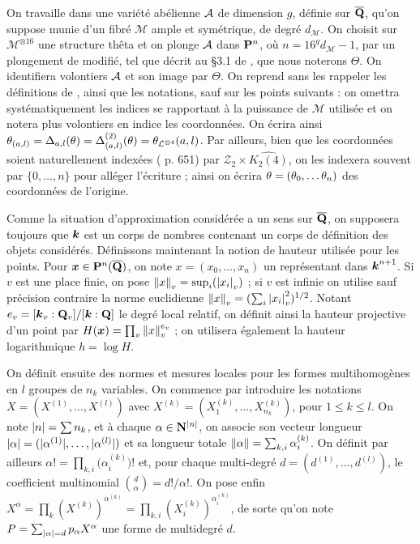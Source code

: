 On travaille dans une variété abélienne $\mathcal A$ de dimension $g$, définie sur
$\overline{\mathbf{Q}}$, qu'on suppose munie d'un fibré $\mathcal{M}$ ample et symétrique, de
degré $d_\mathcal{M}$. On choisit sur $\mathcal{M}^{\otimes 16}$ une structure
thêta et on plonge $\mathcal A$ dans $\mathbf{P}^n$, où $n=16^g d_\mathcal{M} - 1$, par un
plongement de  modifié, tel que décrit au §3.1 de
\cite{daphiminvaii}, que nous noterons $\Theta$. On identifiera volontiers
$\mathcal A$ et son image par $\Theta$. On reprend sans les rappeler les définitions
de , ainsi que les notations, sauf sur les points suivants : on
omettra systématiquement les indices se rapportant à la puissance de
$\mathcal{M}$ utilisée et on notera plus volontiers en indice les coordonnées.
On écrira ainsi $\theta_{(a, l)} = \Delta_{a, l}(\theta)  = \Delta_{(a,
  l)}^{(2)}(\theta) = \theta_{\mathcal{L}^{\otimes 4}}(a, l)$. Par ailleurs, bien
que les coordonnées soient naturellement indexées ( p. 651) par
$\mathcal{Z}_2 \times \widehat{K_2(4)}$, on les indexera souvent par $\{0,
  \dots, n\}$ pour alléger l'écriture  ; ainsi on écrira $\theta = (\theta_0,
\dots \theta_n)$ des coordonnées de l'origine.

\pagebreak[3]

Comme la situation d'approximation considérée a un sens sur $\overline{\mathbf{Q}}$, on
supposera toujours que $\boldsymbol{k}$ est un corps de nombres contenant un corps de
définition des objets considérés. Définissons maintenant la notion de hauteur
utilisée pour les points. Pour $\boldsymbol{x} \in \mathbf{P}^n(\overline{\mathbf{Q}})$, on note $x = (x_0,
\dots, x_n)$ un représentant dans $\boldsymbol{k}^{n+1}$. Si $v$ est une place finie, on
pose $\left\lVert x\right\rVert_{v} = \sup_i(\left\lvert x_i\right\rvert_{v})$ ; si $v$ est infinie on utilise sauf précision
contraire la norme euclidienne $\left\lVert x\right\rVert_{v} = ( \sum_i \left\lvert x_i\right\rvert_{v}^2 )^{1/2}$. Notant
$e_v = [\boldsymbol{k}_v : \mathbf{Q}_v]/[\boldsymbol{k} : \mathbf{Q}]$ le degré local relatif, on définit ainsi
la hauteur projective d'un point par $H(\boldsymbol{x}) = \prod_v \left\lVert x\right\rVert_{v}^{e_v}$ ; on
utilisera également la hauteur logarithmique $h = \log H$.

On définit ensuite des normes et mesures locales pour les formes
multihomogènes en $l$ groupes de $n_k$ variables. On commence par introduire
les notations $X = (X^{(1)}, \dots, X^{(l)})$ avec $X^{(k)} = (X^{(k)}_1,
\dots, X^{(k)}_{n_k})$, pour $1 \le k \le l$. On note ${\lvert n\rvert} = \sum n_k$, et
à chaque $\alpha \in \mathbf{N}^{{\lvert n\rvert}}$, on associe son vecteur longueur
${\lvert\alpha\rvert} = ({\lvert\alpha^{(1)}\rvert}, \dots, {\lvert\alpha^{(l)}\rvert})$ et sa longueur
totale $\lVert\alpha\rVert = \sum_{k, i} \alpha^{(k)}_i$. On définit par ailleurs
$\alpha ! = \prod_{k, i} \big(\alpha^{(k)}_i\big)!$ et, pour chaque
multi-degré $d = (d^{(1)}, \dots, d^{(l)})$, le coefficient multinomial
$\binom{d}{\alpha} = d!/\alpha!$. On pose enfin $X^\alpha = \prod_k
(X^{(k)})^{\alpha^{(k)}} = \prod_{k, i} (X^{(k)}_i)^{\alpha^{(k)}_i}$, de
sorte qu'on note $P = \sum_{{\lvert\alpha\rvert} = d} p_\alpha X^\alpha$ une forme de
multidegré $d$.

